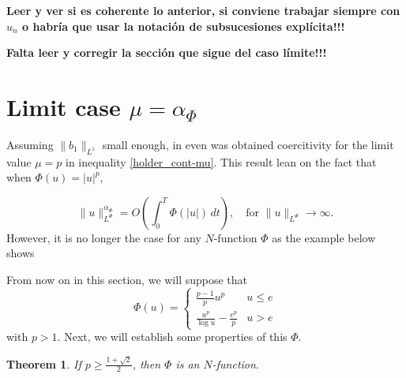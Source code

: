 \documentclass[twoside]{article}
\newtheorem{thm}{Theorem}[section]
\theoremstyle{remark}
\newcommand{\orlnor}{\|_{L^{\Phi}}}
\renewcommand{\leq}{\leqslant}
\renewcommand{\geq}{\geqslant}
\begin{document}
{\bf Leer y ver si es coherente lo anterior,  si conviene trabajar siempre con $u_n$ o habr\'ia que usar la notaci\'on de subsucesiones expl\'icita!!!}

{\bf Falta leer y corregir la  secci\'on que sigue del caso l\'imite!!!}

\section{Limit case $\mu=\alpha_{\Phi}$}
Assuming $\|b_1\|_{L^1}$  small enough, in  \cite{zhao2004periodic, tang2010periodic} even  was obtained coercitivity for the limit value $\mu=p$ in inequality \eqref{holder_cont-mu}.  This result lean on the  fact that when  $\Phi(u)=|u|^p$,

\begin{equation}
 \|u\orlnor^{\alpha_{\Phi}}=O\left(\int_0^T \Phi(|u|)\,dt\right),\quad\text{for } \|u\orlnor\to\infty.
\end{equation}
However, it is no longer the case  for any $N$-function $\Phi$ as the example below shows

From now on in this section, we will suppose that 
\[\Phi(u)=
\left\{
\begin{array}{ll}
\frac{p-1}{p}u^p&u\leq e
\\
\frac{u^p}{\log u}-\frac{e^p}{p}&u>e
\end{array}
\right.\]
with $p>1$. Next, we will establish some properties of this $\Phi$. 

\begin{thm}
If $p\geq \frac{1+\sqrt 2}{2}$, then $\Phi$ is an $N$-function.
\end{thm}
\end{document}
